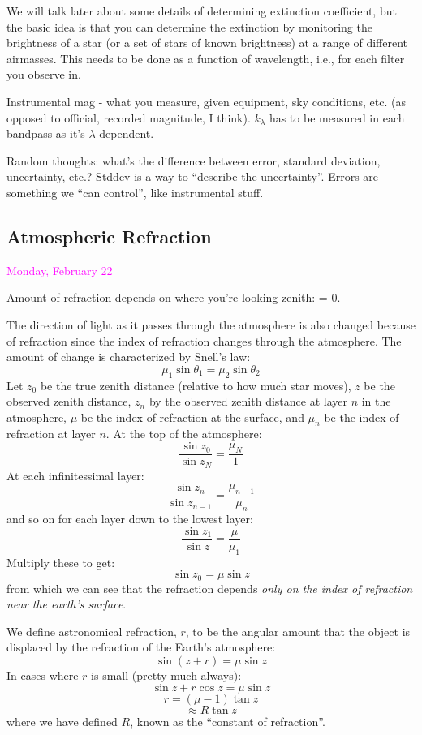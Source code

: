 \documentclass[12pt]{article}
\begin{document}
We will talk later about some details of determining extinction
coefficient, but the basic idea is that you can determine the
extinction by monitoring the brightness of a star (or a set of stars
of known brightness) at a range of different airmasses. This needs to
be done as a function of wavelength, i.e., for each filter you observe
in.

\textcolor{myBlue}{Instrumental mag - what you measure, given
    equipment, sky conditions, etc. (as opposed to official, recorded
    magnitude, I think). $k_{\lambda}$ has to be measured in each
    bandpass as it's $\lambda$-dependent.
}

\textcolor{myBlue}{Random thoughts: what's the difference between
    error, standard deviation, uncertainty, etc.?
    Stddev is a way to ``describe the uncertainty''. Errors are
    something we ``can control'', like instrumental stuff.
}

\subsection*{Atmospheric Refraction}
\textcolor{magenta}{Monday, February 22}

\textcolor{myBlue}{Amount of refraction depends on where you're looking
zenith: = 0}.

The direction of light as it passes through the atmosphere is also
changed because of refraction since the index of refraction changes
through the atmosphere. The amount of change is characterized by
Snell's law:
    $$ \mu_1\sin\theta_1 = \mu_2\sin\theta_2 $$
Let $z_0$ be the true zenith distance (relative to how much
star moves), $z$ be the observed zenith
distance, $z_n$ by the observed zenith distance at layer $n$ in the
atmosphere, $\mu$ be the index of refraction at the surface, and
$\mu_n$ be the index of refraction at layer $n$. At the top of the
atmosphere:
    $$ \frac{\sin z_0}{\sin z_N} = \frac{\mu_N}{1} $$
At each infinitessimal layer:
    $$ \frac{\sin z_n}{\sin z_{n-1}} = \frac{\mu_{n-1}}{\mu_n}  $$
and so on for each layer down to the lowest layer:
    $$ \frac{\sin z_1}{\sin z} = \frac{\mu}{\mu_1}  $$
Multiply these to get:
    $$ \sin z_0 = \mu\sin z  $$
from which we can see that the refraction depends
\emph{only on the index of refraction near the earth's surface}.

We define astronomical refraction, $r$, to be the angular amount that
the object is displaced by the refraction of the Earth's atmosphere:
    $$ \sin(z+r) = \mu\sin z $$
In cases where $r$ is small (pretty much always):
    $$ \sin z + r\cos z = \mu\sin z $$
    $$ r = (\mu-1) \tan z $$
    $$ \approx R\tan z $$
where we have defined $R$, known as the ``constant of refraction''.
\end{document}
